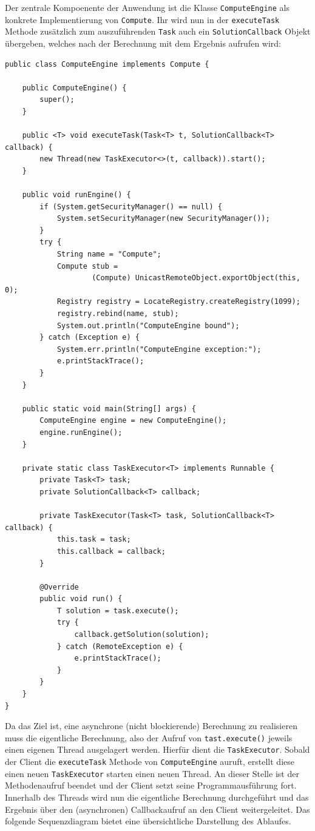 Der zentrale Kompoenente der Anwendung ist die Klasse \texttt{ComputeEngine} als konkrete Implementierung von \texttt{Compute}.
Ihr wird nun in der \texttt{executeTask} Methode zus\"atzlich zum auszuf\"uhrenden \texttt{Task} auch ein \texttt{SolutionCallback} Objekt \"ubergeben, welches nach der Berechnung mit dem Ergebnis aufrufen wird:
\begin{lstlisting}[style=Java, caption=Funktion zur n\"aeherungweisen Berechnung der Euler'schen Zahl]
public class ComputeEngine implements Compute {

    public ComputeEngine() {
        super();
    }

    public <T> void executeTask(Task<T> t, SolutionCallback<T> callback) {
        new Thread(new TaskExecutor<>(t, callback)).start();
    }

    public void runEngine() {
        if (System.getSecurityManager() == null) {
            System.setSecurityManager(new SecurityManager());
        }
        try {
            String name = "Compute";
            Compute stub =
                    (Compute) UnicastRemoteObject.exportObject(this, 0);
            Registry registry = LocateRegistry.createRegistry(1099);
            registry.rebind(name, stub);
            System.out.println("ComputeEngine bound");
        } catch (Exception e) {
            System.err.println("ComputeEngine exception:");
            e.printStackTrace();
        }
    }

    public static void main(String[] args) {
        ComputeEngine engine = new ComputeEngine();
        engine.runEngine();
    }

    private static class TaskExecutor<T> implements Runnable {
        private Task<T> task;
        private SolutionCallback<T> callback;

        private TaskExecutor(Task<T> task, SolutionCallback<T> callback) {
            this.task = task;
            this.callback = callback;
        }

        @Override
        public void run() {
            T solution = task.execute();
            try {
                callback.getSolution(solution);
            } catch (RemoteException e) {
                e.printStackTrace();
            }
        }
    }
}
\end{lstlisting}

Da das Ziel ist, eine asynchrone (nicht blockierende) Berechnung zu realisieren muss die eigentliche Berechnung, also der Aufruf von \texttt{tast.execute()} jeweils einen eigenen Thread ausgelagert werden.
Hierf\"ur dient die \texttt{TaskExecutor}. Sobald der Client die \texttt{executeTask} Methode von \texttt{ComputeEngine} auruft, erstellt diese einen neuen \texttt{TaskExecutor} starten einen neuen Thread.
An dieser Stelle ist der Methodenaufruf beendet und der Client setzt seine Programmausf\"uhrung fort.
Innerhalb des Threads wird nun die eigentliche Berechnung durchgef\"uhrt und das Ergebnis \"uber den (asynchronen) Callbackaufruf an den Client weitergeleitet.
Das folgende Sequenzdiagram bietet eine \"ubersichtliche Darstellung des Ablaufes.

